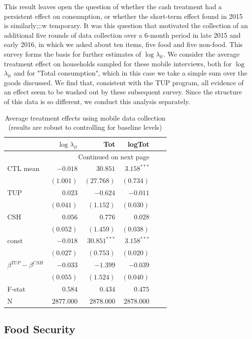 \documentclass[12pt,article]{article}
\begin{document}
This result leaves open the question of whether the cash treatment had a persistent effect
on consumption, or whether the short-term effect found in 2015 is similarly;;:w
temporary. It was this question that motivated the collection of an additional five
rounds of data collection over a 6-month period in late 2015 and early 2016, in which
we asked about ten items, five food and five non-food. This survey forms the basis
for further estimates of $\log$$\lambda$$_{\text{it}}$. We consider the average treatment effect
on households sampled for these mobile interviews, both for $\log$$\lambda$$_{\text{it}}$ and for
"Total consumption", which in this case we take a simple sum over the goods
discussed. We find that, consistent with the TUP program, all evidence of an effect
seem to be washed out by these subsequent survey.  Since the structure of this data
is so different, we conduct this analysis separately.

\begin{longtable}{lrrrrr}
\caption{\label{tab:mobile_consumption}Average treatment effects using mobile data collection (results are robust to controlling for baseline levels)}
\\
\hline
 & $\log\lambda_{it}$ & Tot & logTot\\
\hline
\endhead
\hline\multicolumn{4}{r}{Continued on next page} \\
\endfoot
\endlastfoot
CTL mean & $-0.018$ & $30.851$ & $3.158^{***}$\\
 & $(1.001)$ & $(27.768)$ & $(0.734)$\\
\hline
TUP & $0.023$ & $-0.624$ & $-0.011$\\
 & $(0.041)$ & $(1.152)$ & $(0.030)$\\
CSH & $0.056$ & $0.776$ & $0.028$\\
 & $(0.052)$ & $(1.459)$ & $(0.038)$\\
const & $-0.018$ & $30.851^{***}$ & $3.158^{***}$\\
 & $(0.027)$ & $(0.753)$ & $(0.020)$\\
\hline
$\beta^{TUP}-\beta^{CSH}$ & $-0.033$ & $-1.399$ & $-0.039$\\
 & $(0.055)$ & $(1.524)$ & $(0.040)$\\
\hline
F-stat & $0.584$ & $0.434$ & $0.475$\\
N & $2877.000$ & $2878.000$ & $2878.000$\\
\hline
\end{longtable}


\subsection{Food Security}
\label{sec-3-3}
\end{document}
